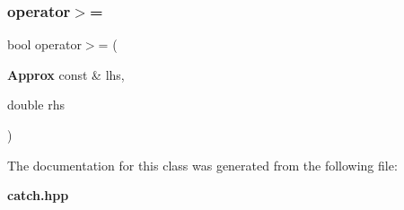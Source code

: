 \mbox{\label{class_catch_1_1_detail_1_1_approx_adaba11ee9aabb4d51d4855f09aa7f7df}} 
\subsubsection{operator$>$=\hspace{0.1cm}{\footnotesize\ttfamily [2/2]}}
{\footnotesize\ttfamily bool operator$>$= (\begin{DoxyParamCaption}\item[{\textbf{ Approx} const \&}]{lhs,  }\item[{double}]{rhs }\end{DoxyParamCaption})\hspace{0.3cm}{\ttfamily [friend]}}



The documentation for this class was generated from the following file\+:\begin{DoxyCompactItemize}
\item 
\textbf{ catch.\+hpp}\end{DoxyCompactItemize}
